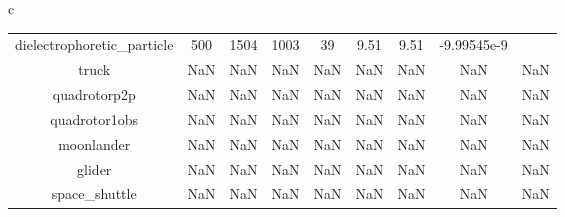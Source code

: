 \documentclass{standalone}
\begin{document}
\begin{tabular}{c}
\begin{tabular}{ccccccccc}
  dielectrophoretic\_particle & 500 & 1504 & 1003 & 39 & 9.51 & 9.51 & -9.99545e-9 & \color{red}{Infeasible Problem} \\
  truck & NaN & NaN & NaN & NaN & NaN & NaN & NaN & NaN \\
  quadrotorp2p & NaN & NaN & NaN & NaN & NaN & NaN & NaN & NaN \\
  quadrotor1obs & NaN & NaN & NaN & NaN & NaN & NaN & NaN & NaN \\
  moonlander & NaN & NaN & NaN & NaN & NaN & NaN & NaN & NaN \\
  glider & NaN & NaN & NaN & NaN & NaN & NaN & NaN & NaN \\
  space\_shuttle & NaN & NaN & NaN & NaN & NaN & NaN & NaN & NaN \\\hline
\end{tabular}
\end{tabular}
\end{document}
